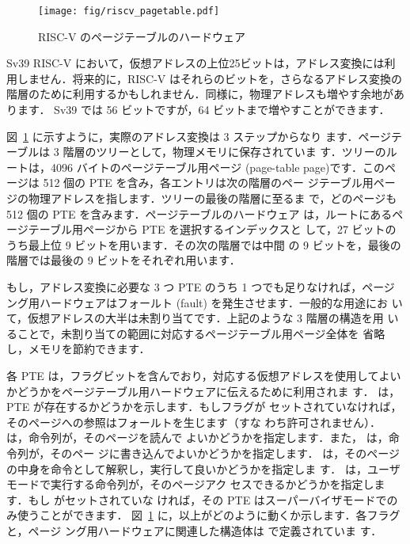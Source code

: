 \begin{figure}[t]
\center
\texttt{[image: fig/riscv\_pagetable.pdf]}
\caption{RISC-V のページテーブルのハードウェア}
\label{fig:riscv_pagetable}
\end{figure}

Sv39 RISC-V において，仮想アドレスの上位25ビットは，アドレス変換には利
用しません．将来的に，RISC-V はそれらのビットを，さらなるアドレス変換の
階層のために利用するかもしれません．同様に，物理アドレスも増やす余地があります．
Sv39 では 56 ビットですが，64 ビットまで増やすことができます．

図~\ref{fig:riscv_pagetable} に示すように，実際のアドレス変換は 3 ステップからなり
ます．ページテーブルは 3 階層のツリーとして，物理メモリに保存されていま
す．ツリーのルートは，4096 バイトのページテーブル用ページ (page-table
page)です．このページは 512 個の PTE を含み，各エントリは次の階層のペー
ジテーブル用ページの物理アドレスを指します．ツリーの最後の階層に至るま
で，どのページも 512 個の PTE を含みます．ページテーブルのハードウェア
は，ルートにあるページテーブル用ページから PTE を選択するインデックスと
して，27 ビットのうち最上位 9 ビットを用います．その次の階層では中間
の 9 ビットを，最後の階層では最後の 9 ビットをそれぞれ用います．

もし，アドレス変換に必要な 3 つ PTE のうち 1 つでも足りなければ，ページ
ング用ハードウェアはフォールト (fault) を発生させます．一般的な用途にお
いて，仮想アドレスの大半は未割り当てです．上記のような 3 階層の構造を用
いることで，未割り当ての範囲に対応するページテーブル用ページ全体を
省略し，メモリを節約できます．

各 PTE は，フラグビットを含んでおり，対応する仮想アドレスを使用してよい
かどうかをページテーブル用ハードウェアに伝えるために利用されま
す． は，PTE が存在するかどうかを示します．もしフラグが
セットされていなければ，そのページへの参照はフォールトを生じます（すな
わち許可されません）． は，命令列が，そのページを読んで
よいかどうかを指定します．また， は，命令列が，そのペー
ジに書き込んでよいかどうかを指定します． は，そのページ
の中身を命令として解釈し，実行して良いかどうかを指定しま
す． は，ユーザモードで実行する命令列が，そのページアク
セスできるかどうかを指定します．もし  がセットされていな
ければ，その PTE はスーパーバイザモードでのみ使うことができます．
図~\ref{fig:riscv_pagetable} に，以上がどのように動くか示します．各フラグと，ページ
ング用ハードウェアに関連した構造体は  で定義されていま
す．

